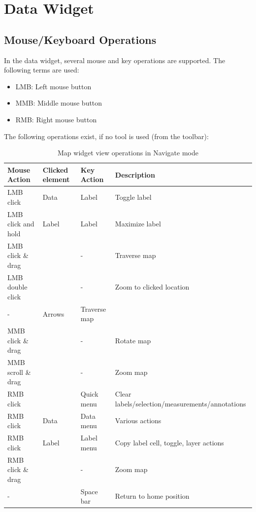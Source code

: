 \section{Data Widget}
\label{sec:geoview_data}

\subsection{Mouse/Keyboard Operations}
In the data widget, several mouse and key operations are supported. The following terms are used:

\begin{itemize}
 \item LMB: Left mouse button
 \item MMB: Middle mouse button
 \item RMB: Right mouse button
\end{itemize}

The following operations exist, if no tool is used (from the toolbar):

\begin{table}[H]
  \center
  \begin{tabular}{ | l | l | l | l |}
    \hline
    \textbf{Mouse Action} & \textbf{Clicked element} &\textbf{Key Action} &  \textbf{Description} \\ \hline
    LMB click & Data & Label & Toggle label \\ \hline
    LMB click and hold & Label & Label & Maximize label \\ \hline
    LMB click \& drag & & - & Traverse map \\ \hline
    LMB double click & & - & Zoom to clicked location \\ \hline
    - & Arrows & Traverse map \\ \hline
    MMB click \& drag & & - & Rotate map \\ \hline
    MMB scroll \& drag & & - & Zoom map \\ \hline
    RMB click & & Quick menu & Clear labels/selection/measurements/annotations \\ \hline
    RMB click & Data & Data menu & Various actions \\ \hline
    RMB click & Label & Label menu & Copy label cell, toggle, layer actions \\ \hline
    RMB click \& drag & & - & Zoom map \\ \hline
    - & & Space bar & Return to home position \\ \hline
  \end{tabular}
  \caption{Map widget view operations in Navigate mode}
\end{table}

